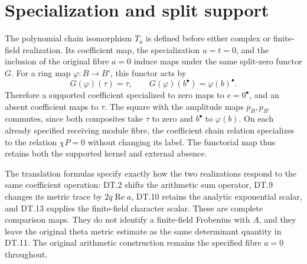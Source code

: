 \documentclass[11pt,a4paper]{article}
\begin{document}
\section{Specialization and split support}
The polynomial chain isomorphism \(T_a\) is defined before either
complex or finite-field realization. Its coefficient map, the
specialization \(u=t=0\), and the inclusion of the original fibre
\(a=0\) induce maps under the same split-zero functor \(G\).
For a ring map \(\varphi:B\to B'\), this functor acts by
\[
 G(\varphi)(\tau)=\tau,\qquad
 G(\varphi)(b^\bullet)=\varphi(b)^\bullet.
\]
Therefore a supported coefficient specialized to zero maps to
\(e=0^\bullet\), and an absent coefficient maps to \(\tau\).
The square with the amplitude maps \(p_B,p_{B'}\) commutes, since
both composites take \(\tau\) to zero and \(b^\bullet\) to
\(\varphi(b)\). On each already specified receiving module fibre,
the coefficient chain relation specializes to the relation
\(\chi P=0\) without changing its label. The functorial map thus
retains both the supported kernel and external absence.

The translation formulas specify exactly how the two realizations
respond to the same coefficient operation: DT.2 shifts the arithmetic
sum operator, DT.9 changes its metric trace by \(2q\operatorname{Re}a\),
DT.10 retains the analytic exponential scalar, and DT.13 supplies the
finite-field character scalar. These are complete comparison maps.
They do not identify a finite-field Frobenius with \(A\), and they
leave the original theta metric estimate as the same determinant
quantity in DT.11. The original arithmetic construction remains
the specified fibre \(a=0\) throughout.
\end{document}
